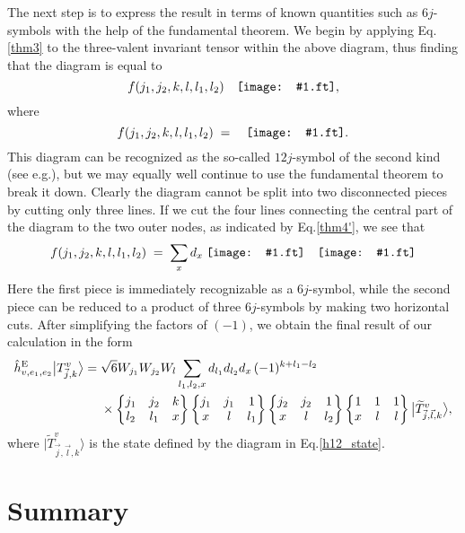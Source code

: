 \documentclass[graybox, secnum]{svmult}
\makeatletter
\newcommand{\ft}{pdf}        %
\newcommand{\makeSymbol}[1]{\mathord{\vcenter{\hbox{#1}}}}
\newcommand{\Symbol}[1]{\makeSymbol{\texttt{[image: \#1.\\ft]}}}
\newcommand{\bket}[1]{\bigl|#1\bigr\rangle}
\newcommand{\eg}{e.g.\@\xspace}
\newcommand{\Eq}[1]{Eq.\@\xspace\eqref{#1}}
\newcommand{\sixj}[6]{\begin{Bmatrix} #1&#2&#3 \\ #4&#5&#6 \end{Bmatrix}}
\makeatother
\begin{document}
The next step is to express the result in terms of known quantities such as $6j$-symbols with the help of the fundamental theorem. We begin by applying \Eq{thm3} to the three-valent invariant tensor within the above diagram, thus finding that the diagram is equal to
\begin{equation}
	f(j_1, j_2, k, l, l_1, l_2) \quad \Symbol{h12_action_final},
	\label{h12_state}
\end{equation}
where
\begin{equation}
	f(j_1, j_2, k, l, l_1, l_2) \; = \quad \Symbol{12j}.
	\label{12j}
\end{equation}
This diagram can be recognized as the so-called $12j$-symbol of the second kind (see \eg \cite{Varshalovich:1988ye, Yutsis:1962bk}), but we may equally well continue to use the fundamental theorem to break it down. Clearly the diagram cannot be split into two disconnected pieces by cutting only three lines. If we cut the four lines connecting the central part of the diagram to the two outer nodes, as indicated by \Eq{thm4'}, we see that
\begin{equation}
	f(j_1, j_2, k, l, l_1, l_2) \; = \; \sum_x d_x \; \Symbol{12j_piece1} \quad \Symbol{12j_piece2}
	\label{}
\end{equation}
Here the first piece is immediately recognizable as a $6j$-symbol, while the second piece can be reduced to a product of three $6j$-symbols by making two horizontal cuts. After simplifying the factors of $(-1)$, we obtain the final result of our calculation in the form
\begin{align}
	\hat h^{\rm E}_{v, e_1, e_2} \bket{T^v_{\vec j, k}} ={} &\sqrt 6 W_{j_1}W_{j_2}W_l \sum_{l_1, l_2,x} d_{l_1}d_{l_2}d_x\,(-1)^{k+l_1-l_2} \notag \\
	&\times \sixj{j_1}{j_2}{k}{l_2}{l_1}{x}\sixj{j_1}{j_1}{1}{x}{l}{l_1}\sixj{j_2}{j_2}{1}{x}{l}{l_2}\sixj{1}{1}{1}{x}{l}{l}\bket{\widetilde T^v_{\vec j, \vec l, k}},
	\label{h12_final}
\end{align}
where $\bket{\widetilde T^v_{\vec j, \vec l, k}}$ is the state defined by the diagram in \Eq{h12_state}.

\section{Summary}
\label{sec:summary}
\end{document}
